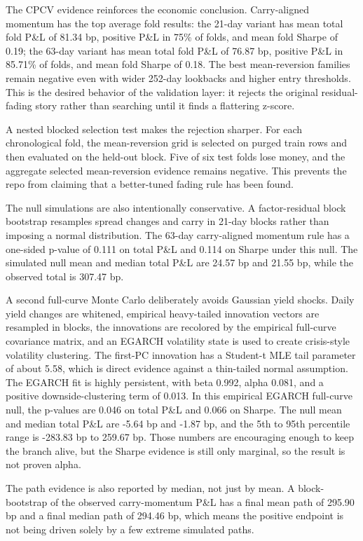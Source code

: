 \documentclass[12pt]{article}
\begin{document}
The CPCV evidence reinforces the economic conclusion. Carry-aligned momentum has the top
average fold results: the 21-day variant has mean total fold P\&L of 81.34 bp, positive P\&L in
75\% of folds, and mean fold Sharpe of 0.19; the 63-day variant has mean total fold P\&L of
76.87 bp, positive P\&L in 85.71\% of folds, and mean fold Sharpe of 0.18. The best mean-reversion
families remain negative even with wider 252-day lookbacks and higher entry thresholds. This is
the desired behavior of the validation layer: it rejects the original residual-fading story rather than
searching until it finds a flattering z-score.

A nested blocked selection test makes the rejection sharper. For each chronological fold, the
mean-reversion grid is selected on purged train rows and then evaluated on the held-out block.
Five of six test folds lose money, and the aggregate selected mean-reversion evidence remains
negative. This prevents the repo from claiming that a better-tuned fading rule has been found.

The null simulations are also intentionally conservative. A factor-residual block bootstrap
resamples spread changes and carry in 21-day blocks rather than imposing a normal distribution.
The 63-day carry-aligned momentum rule has a one-sided p-value of 0.111 on total P\&L and
0.114 on Sharpe under this null. The simulated null mean and median total P\&L are 24.57 bp
and 21.55 bp, while the observed total is 307.47 bp.

A second full-curve Monte Carlo deliberately avoids Gaussian yield shocks. Daily yield changes
are whitened, empirical heavy-tailed innovation vectors are resampled in blocks, the innovations
are recolored by the empirical full-curve covariance matrix, and an EGARCH volatility state is
used to create crisis-style volatility clustering. The first-PC innovation has a Student-t MLE tail
parameter of about 5.58, which is direct evidence against a thin-tailed normal assumption. The
EGARCH fit is highly persistent, with beta 0.992, alpha 0.081, and a positive downside-clustering
term of 0.013. In this empirical EGARCH full-curve null, the p-values are 0.046 on total P\&L and
0.066 on Sharpe. The null mean and median total P\&L are -5.64 bp and -1.87 bp, and the 5th to
95th percentile range is -283.83 bp to 259.67 bp. Those numbers are encouraging enough to keep
the branch alive, but the Sharpe evidence is still only marginal, so the result is not proven alpha.

The path evidence is also reported by median, not just by mean. A block-bootstrap of the observed
carry-momentum P\&L has a final mean path of 295.90 bp and a final median path of 294.46 bp,
which means the positive endpoint is not being driven solely by a few extreme simulated paths.
\end{document}
